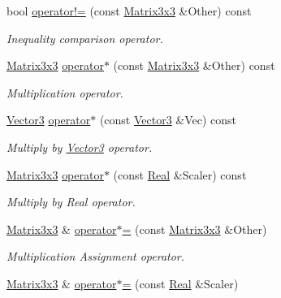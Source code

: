 \begin{DoxyCompactItemize}
bool \hyperlink{classMezzanine_1_1Matrix3x3_a08a22ec815e1871a7177d0b14111eabd}{operator!=} (const \hyperlink{classMezzanine_1_1Matrix3x3}{Matrix3x3} \&Other) const 
\begin{DoxyCompactList}\small\item\em Inequality comparison operator. \item\end{DoxyCompactList}\item 
\hyperlink{classMezzanine_1_1Matrix3x3}{Matrix3x3} \hyperlink{classMezzanine_1_1Matrix3x3_ab2fd04fc7d4e0783f399bbeb48712999}{operator$\ast$} (const \hyperlink{classMezzanine_1_1Matrix3x3}{Matrix3x3} \&Other) const 
\begin{DoxyCompactList}\small\item\em Multiplication operator. \item\end{DoxyCompactList}\item 
\hyperlink{classMezzanine_1_1Vector3}{Vector3} \hyperlink{classMezzanine_1_1Matrix3x3_a9d0a16945a5dcfad1faba1827ccfb551}{operator$\ast$} (const \hyperlink{classMezzanine_1_1Vector3}{Vector3} \&Vec) const 
\begin{DoxyCompactList}\small\item\em Multiply by \hyperlink{classMezzanine_1_1Vector3}{Vector3} operator. \item\end{DoxyCompactList}\item 
\hyperlink{classMezzanine_1_1Matrix3x3}{Matrix3x3} \hyperlink{classMezzanine_1_1Matrix3x3_aa5fbf34746b1527f71113d0097e86390}{operator$\ast$} (const \hyperlink{namespaceMezzanine_a726731b1a7df72bf3583e4a97282c6f6}{Real} \&Scaler) const 
\begin{DoxyCompactList}\small\item\em Multiply by Real operator. \item\end{DoxyCompactList}\item 
\hyperlink{classMezzanine_1_1Matrix3x3}{Matrix3x3} \& \hyperlink{classMezzanine_1_1Matrix3x3_ac4c992db2d2c2e171f416a1b8b2e7f35}{operator$\ast$=} (const \hyperlink{classMezzanine_1_1Matrix3x3}{Matrix3x3} \&Other)
\begin{DoxyCompactList}\small\item\em Multiplication Assignment operator. \item\end{DoxyCompactList}\item 
\hyperlink{classMezzanine_1_1Matrix3x3}{Matrix3x3} \& \hyperlink{classMezzanine_1_1Matrix3x3_ab1de2ed0aedf5b998b235c44b6f742ed}{operator$\ast$=} (const \hyperlink{namespaceMezzanine_a726731b1a7df72bf3583e4a97282c6f6}{Real} \&Scaler)

\end{DoxyCompactItemize}
